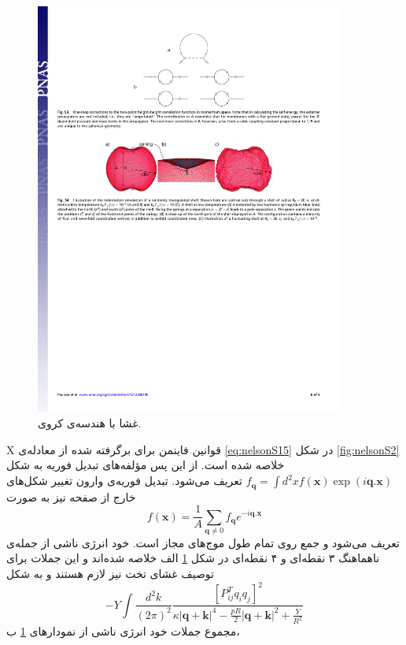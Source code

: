\begin{figure}[h]
\begin{center}
\includegraphics[width=4in]{Figs/nelsonS3}
\caption{
غشا با هندسه‌ی کروی.
}
\label{fig:nelsonS3}
\end{center}
\end{figure}
X
 قوانین فاینمن برای برگرفته شده از معادله‌ی \ref{eq:nelsonS15} 
 در شکل \ref{fig:nelsonS2}
 خلاصه شده است. از این پس مؤلفه‌های تبدیل فوریه به شکل
 $f_{\boldsymbol q}=\int d^2xf(\boldsymbol x)\exp(i\boldsymbol q.\boldsymbol x)$
 تعریف می‌شود. تبدیل فوریه‌ی وارون تغییر شکل‌های خارج از صفحه نیز به صورت
\begin{equation}
f(\boldsymbol x)=\frac{1}{A}\sum_{\boldsymbol q\neq 0}f_{\boldsymbol q}e^{-i\boldsymbol q.\boldsymbol x}
\label{eq:nelsonSٓ18}
\end{equation}
تعریف می‌شود و جمع روی تمام طول موج‌های مجاز است. خود انرژی ناشی از جمله‌ی ناهماهنگ ۳ نقطه‌ای و ۴ نقطه‌ای در شکل \ref{fig:nelsonS3}
الف خلاصه شده‌اند و این جملات برای توصیف غشای تخت نیز لازم هستند و به شکل 
\begin{equation}
-Y\int\frac{d^2k}{(2\pi)^2}\frac{\left[P_{ij}^Tq_iq_j\right]^2}{\kappa|\boldsymbol q + \boldsymbol k|^4-\frac{pR}{2}|\boldsymbol q + \boldsymbol k|^2+\frac{Y}{R^2}}
\label{eq:nelsonS19}
\end{equation}
 مجموع جملات خود انرژی ناشی از نمودارهای \ref{fig:nelsonS3}
 ب،


